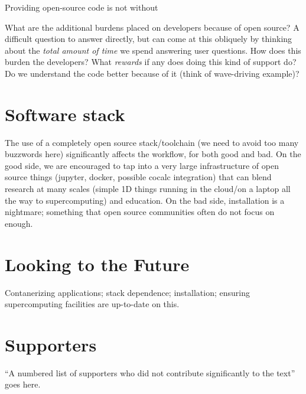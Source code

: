 \documentclass{paper}
\begin{document}
Providing open-source code is not without 

What are the additional burdens placed on developers because of open source? A difficult question to answer directly, but can come at this obliquely by thinking about the \emph{total amount of time} we spend answering user questions. How does this burden the developers? What \emph{rewards} if any does doing this kind of support do? Do we understand the code better because of it (think of wave-driving example)? 

\section{Software stack}
\label{sec:stack}

The use of a completely open source stack/toolchain (we need to avoid too many buzzwords here) significantly affects the workflow, for both good and bad. On the good side, we are encouraged to tap into a very large infrastructure of open source things (jupyter, docker, possible cocalc integration) that can blend research at many scales (simple 1D things running in the cloud/on a laptop all the way to supercomputing) and education. On the bad side, installation is a nightmare; something that open source communities often do not focus on enough.

\section{Looking to the Future}
\label{sec:future}

Contanerizing applications; stack dependence; installation; ensuring supercomputing facilities are up-to-date on this.
\appendix

\section{Supporters}
\label{sec:supporters}

``A numbered list of supporters who did not contribute significantly to the text'' goes here.


\end{document}
